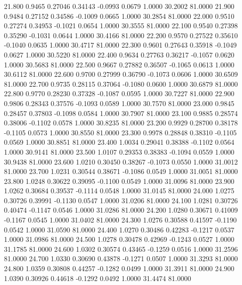   21.800   0.9465   0.27046   0.34143  -0.0993   0.0679   1.0000  30.2002  81.0000
  21.900   0.9484   0.27152   0.34586  -0.1009   0.0665   1.0000  30.2854  81.0000
  22.000   0.9510   0.27274   0.34953  -0.1021   0.0654   1.0000  30.3555  81.0000
  22.100   0.9540   0.27398   0.35290  -0.1031   0.0644   1.0000  30.4166  81.0000
  22.200   0.9570   0.27522   0.35610  -0.1040   0.0635   1.0000  30.4717  81.0000
  22.300   0.9601   0.27643   0.35918  -0.1049   0.0627   1.0000  30.5220  81.0000
  22.400   0.9634   0.27763   0.36217  -0.1057   0.0620   1.0000  30.5683  81.0000
  22.500   0.9667   0.27882   0.36507  -0.1065   0.0613   1.0000  30.6112  81.0000
  22.600   0.9700   0.27999   0.36790  -0.1073   0.0606   1.0000  30.6509  81.0000
  22.700   0.9735   0.28115   0.37064  -0.1080   0.0600   1.0000  30.6879  81.0000
  22.800   0.9770   0.28230   0.37328  -0.1087   0.0595   1.0000  30.7227  81.0000
  22.900   0.9806   0.28343   0.37576  -0.1093   0.0589   1.0000  30.7570  81.0000
  23.000   0.9845   0.28457   0.37803  -0.1098   0.0584   1.0000  30.7907  81.0000
  23.100   0.9885   0.28574   0.38006  -0.1102   0.0578   1.0000  30.8235  81.0000
  23.200   0.9929   0.28700   0.38178  -0.1105   0.0573   1.0000  30.8550  81.0000
  23.300   0.9978   0.28848   0.38310  -0.1105   0.0569   1.0000  30.8851  81.0000
  23.400   1.0034   0.29041   0.38388  -0.1102   0.0564   1.0000  30.9141  81.0000
  23.500   1.0107   0.29353   0.38383  -0.1094   0.0559   1.0000  30.9438  81.0000
  23.600   1.0210   0.30450   0.38267  -0.1073   0.0550   1.0000  31.0012  81.0000
  23.700   1.0231   0.30544   0.38671  -0.1086   0.0549   1.0000  31.0051  81.0000
  23.800   1.0248   0.30622   0.39095  -0.1100   0.0549   1.0000  31.0096  81.0000
  23.900   1.0262   0.30684   0.39537  -0.1114   0.0548   1.0000  31.0145  81.0000
  24.000   1.0275   0.30726   0.39991  -0.1130   0.0547   1.0000  31.0206  81.0000
  24.100   1.0281   0.30726   0.40474  -0.1147   0.0546   1.0000  31.0286  81.0000
  24.200   1.0280   0.30671   0.41009  -0.1167   0.0545   1.0000  31.0402  81.0000
  24.300   1.0276   0.30588   0.41597  -0.1190   0.0542   1.0000  31.0590  81.0000
  24.400   1.0270   0.30486   0.42283  -0.1217   0.0537   1.0000  31.0986  81.0000
  24.500   1.0278   0.30478   0.42969  -0.1243   0.0527   1.0000  31.1785  81.0000
  24.600   1.0302   0.30574   0.43465  -0.1259   0.0516   1.0000  31.2596  81.0000
  24.700   1.0330   0.30690   0.43878  -0.1271   0.0507   1.0000  31.3293  81.0000
  24.800   1.0359   0.30808   0.44257  -0.1282   0.0499   1.0000  31.3911  81.0000
  24.900   1.0390   0.30926   0.44618  -0.1292   0.0492   1.0000  31.4474  81.0000
